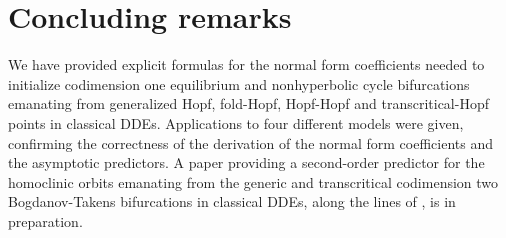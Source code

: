 % 

\section{Concluding remarks}
We have provided explicit formulas for the normal form coefficients needed to initialize codimension one equilibrium and nonhyperbolic cycle bifurcations emanating from generalized Hopf, fold-Hopf, Hopf-Hopf and transcritical-Hopf points in classical DDEs. Applications to four different models were given, confirming the correctness of the derivation of the normal form coefficients and the asymptotic predictors. A paper providing a second-order predictor for the homoclinic orbits emanating from the generic and transcritical codimension two Bogdanov-Takens bifurcations in classical DDEs, along the lines of \cite{kouznetsov2014improved}, is in preparation.

